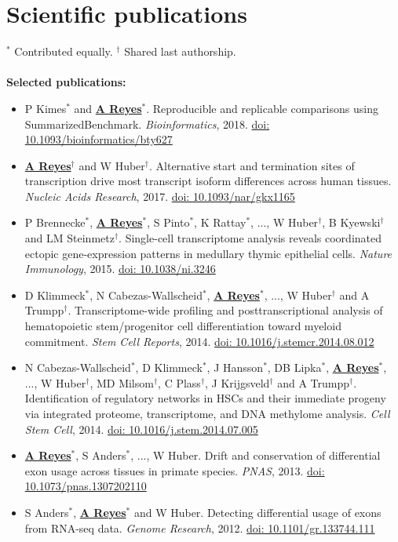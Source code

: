 \documentclass[11pt,a4paper,sans]{moderncv} %
\begin{document}
\section{Scientific publications}
\vspace{-.1cm}
\footnotesize{$^{\ast}$ Contributed equally.} \hspace{.5cm}
\footnotesize{$^{\dagger}$ Shared last authorship.} \\
\\
\vspace{.1cm}
\textbf{Selected publications:}
\begin{itemize}
\item P Kimes$^{\ast}$ and \textbf{\underline{A Reyes}}$^{\ast}$. Reproducible and replicable comparisons using SummarizedBenchmark. \textit{Bioinformatics}, 2018. \href{https://doi.org/10.1093/bioinformatics/bty627}{doi: 10.1093/bioinformatics/bty627}
\item \textbf{\underline{A Reyes}}$^{\dagger}$ and W Huber$^{\dagger}$. Alternative start and termination sites of transcription drive most transcript isoform differences across human tissues. \textit{Nucleic Acids Research}, 2017. \href{https://doi.org/10.1093/nar/gkx1165}{doi: 10.1093/nar/gkx1165}
\item P Brennecke$^{\ast}$, \textbf{\underline{A Reyes}}$^{\ast}$, S Pinto$^{\ast}$, K Rattay$^{\ast}$, ..., W Huber$^{\dagger}$, B Kyewski$^{\dagger}$ and LM Steinmetz$^{\dagger}$. Single-cell transcriptome analysis reveals coordinated ectopic gene-expression patterns in medullary thymic epithelial cells. \textit{Nature Immunology}, 2015. \href{https://doi.org/10.1038/ni.3246}{doi: 10.1038/ni.3246}
\item D Klimmeck$^{\ast}$, N Cabezas-Wallscheid$^{\ast}$, \textbf{\underline{A Reyes}}$^{\ast}$, ..., W Huber$^{\dagger}$ and A Trumpp$^{\dagger}$. Transcriptome-wide profiling and posttranscriptional analysis of hematopoietic stem/progenitor cell differentiation toward myeloid commitment. \textit{Stem Cell Reports}, 2014. \href{https://doi.org/10.1016/j.stemcr.2014.08.012}{doi: 10.1016/j.stemcr.2014.08.012}
\item N Cabezas-Wallscheid$^{\ast}$, D Klimmeck$^{\ast}$, J Hansson$^{\ast}$, DB Lipka$^{\ast}$, \textbf{\underline{A Reyes}}$^{\ast}$, ..., W Huber$^{\dagger}$, MD Milsom$^{\dagger}$, C Plass$^{\dagger}$, J Krijgsveld$^{\dagger}$ and A Trumpp$^{\dagger}$. Identification of regulatory networks in HSCs and their immediate progeny via integrated proteome, transcriptome, and DNA methylome analysis. \textit{Cell Stem Cell}, 2014. \href{https://doi.org/10.1016/j.stem.2014.07.005}{doi: 10.1016/j.stem.2014.07.005}
\item \textbf{\underline{A Reyes}}$^{\ast}$, S Anders$^{\ast}$, ..., W Huber. Drift and conservation of differential exon usage across tissues in primate species. \textit{PNAS}, 2013. \href{https://doi.org/10.1073/pnas.1307202110}{doi: 10.1073/pnas.1307202110}
\item S Anders$^{\ast}$, \textbf{\underline{A Reyes}}$^{\ast}$ and W Huber. Detecting differential usage of exons from RNA-seq data. \textit{Genome Research}, 2012. \href{https://doi.org/10.1101/gr.133744.111}{doi: 10.1101/gr.133744.111}
\end{itemize}
\end{document}
